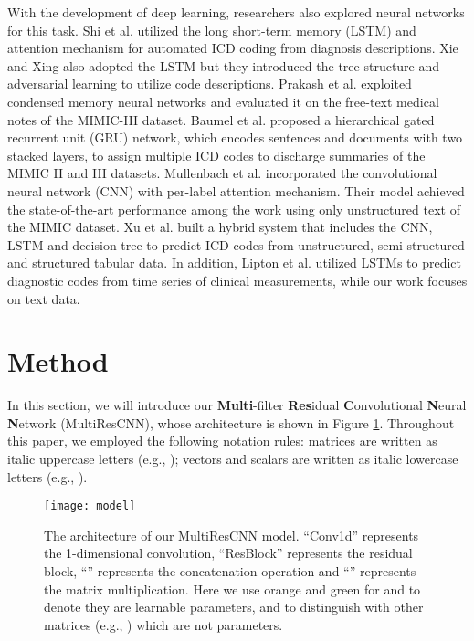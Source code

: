 \documentclass[letterpaper]{article} \usepackage{aaai20}  \usepackage{times}  \usepackage{helvet} \usepackage{courier}  \usepackage[hyphens]{url}  \usepackage{graphicx} \urlstyle{rm} \def\UrlFont{\rm}  \usepackage{graphicx}  \frenchspacing  \setlength{\pdfpagewidth}{8.5in}  \setlength{\pdfpageheight}{11in}
\begin{document}
With the development of deep learning, researchers also explored neural networks for this task. Shi et al.  utilized the long short-term memory (LSTM) and attention mechanism for automated ICD coding from diagnosis descriptions. Xie and Xing  also adopted the LSTM but they introduced the tree structure and adversarial learning to utilize code descriptions. Prakash et al.  exploited condensed memory neural networks and evaluated it on the free-text medical notes of the MIMIC-III dataset. Baumel et al.  proposed a hierarchical gated recurrent unit (GRU) network, which encodes sentences and documents with two stacked layers, to assign multiple ICD codes to discharge summaries of the MIMIC II and III datasets. Mullenbach et al.  incorporated the convolutional neural network (CNN) with per-label attention mechanism. Their model achieved the state-of-the-art performance among the work using only unstructured text of the MIMIC dataset. Xu et al.  built a hybrid system that includes the CNN, LSTM and decision tree to predict ICD codes from unstructured, semi-structured and structured tabular data. In addition, Lipton et al.  utilized LSTMs to predict diagnostic codes from time series of clinical measurements, while our work focuses on text data.

\section{Method}
In this section, we will introduce our \textbf{Multi}-filter \textbf{Res}idual \textbf{C}onvolutional \textbf{N}eural \textbf{N}etwork (MultiResCNN), whose architecture is shown in Figure \ref{fig:model}. Throughout this paper, we employed the following notation rules: matrices are written as italic uppercase letters (e.g., ); vectors and scalars are written as italic lowercase letters (e.g., ).

\begin{figure}[t]
\centering
\texttt{[image: model]} 
\caption{The architecture of our MultiResCNN model. ``Conv1d'' represents the 1-dimensional convolution, ``ResBlock'' represents the residual block, ``'' represents the concatenation operation and ``'' represents the matrix multiplication. Here we use orange and green for  and  to denote they are learnable parameters, and to distinguish with other matrices (e.g., ) which are not parameters. 
}
\label{fig:model}
\end{figure}
\end{document}
